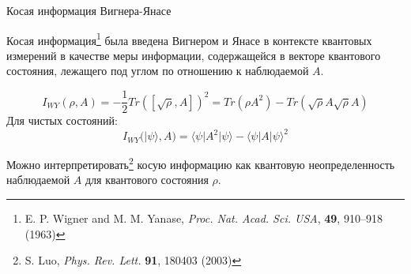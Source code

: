 \begin{frame}{Косая информация Вигнера-Янасе}
  \begin{block}{}
    Косая информация\footnote[frame]{
      E. P. Wigner and M. M. Yanase,
      \textit{Proc. Nat. Acad. Sci. USA},
      \textbf{49}, 910–918 (1963)
    }
    была введена Вигнером и Янасе в контексте квантовых измерений в качестве меры информации,
    содержащейся в векторе квантового состояния, лежащего под углом по отношению к наблюдаемой $A$.
  \end{block}
  $$
    I_{WY}(\rho, A)
    = -\frac{1}{2} Tr([\sqrt{\rho}, A])^2
    = Tr(\rho A^2) - Tr(\sqrt \rho A \sqrt \rho  A )
  $$
  Для чистых состояний:
  $$
    I_{WY}(| \psi \rangle, A)
    = \langle \psi | A^2 | \psi \rangle - \langle \psi | A| \psi \rangle ^2
  $$
  \vspace{-5mm}
  \begin{block}{}
    Можно интерпретировать\footnote[frame]{S. Luo, \textit{Phys. Rev. Lett.} \textbf{91}, 180403 (2003)}
    косую информацию
    как квантовую неопределенность наблюдаемой $A$ для квантового состояния $\rho$.
  \end{block}
\end{frame}
